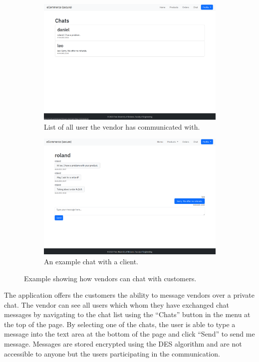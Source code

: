 \documentclass[conference,onecolumn,a4paper]{IEEEtran}
\begin{document}
\begin{figure}[H]
    \centering
    \begin{subfigure}[b]{0.4\linewidth}
        \includegraphics[width=\linewidth]{resources/chat-list.png}
        \caption{List of all user the vendor has communicated with.}
    \end{subfigure}
    \begin{subfigure}[b]{0.4\linewidth}
        \includegraphics[width=\linewidth]{resources/chat.png}
        \caption{An example chat with a client.}
    \end{subfigure}
    \caption{Example showing how vendors can chat with customers.}
\end{figure}

The application offers the customers the ability to message vendors over a private chat. The vendor can see all users which whom they have exchanged chat messages by navigating to the chat list using the “Chats” button in the menu at the top of the page. By selecting one of the chats, the user is able to type a message into the text area at the bottom of the page and click “Send” to send me message. Messages are stored encrypted using the DES algorithm and are not accessible to anyone but the users participating in the communication.
\end{document}
